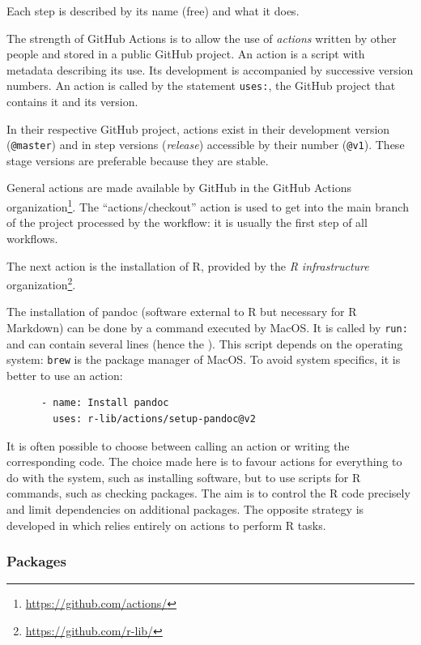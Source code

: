 \documentclass[
  12pt,
  american,
  a4paper,
  extrafontsizes,onecolumn,openright
  ]{memoir}
\newlength{\rf}
\begin{document}
Each step is described by its name (free) and what it does.

The strength of GitHub Actions is to allow the use of \emph{actions} written by other people and stored in a public GitHub project.
An action is a script with metadata describing its use.
Its development is accompanied by successive version numbers.
An action is called by the statement \texttt{uses:}, the GitHub project that contains it and its version.

In their respective GitHub project, actions exist in their development version (\texttt{@master}) and in step versions (\emph{release}) accessible by their number (\texttt{@v1}).
These stage versions are preferable because they are stable.

General actions are made available by GitHub in the GitHub Actions organization\footnote{\url{https://github.com/actions/}}.
The \enquote{actions/checkout} action is used to get into the main branch of the project processed by the workflow: it is usually the first step of all workflows.

The next action is the installation of R, provided by the \emph{R infrastructure} organization\footnote{\url{https://github.com/r-lib/}}.

The installation of pandoc (software external to R but necessary for R Markdown) can be done by a command executed by MacOS.
It is called by \texttt{run:} and can contain several lines (hence the \texttt{\textbar{}}).
This script depends on the operating system: \texttt{brew} is the package manager of MacOS.
To avoid system specifics, it is better to use an action:

\begin{verbatim}
      - name: Install pandoc
        uses: r-lib/actions/setup-pandoc@v2
\end{verbatim}

It is often possible to choose between calling an action or writing the corresponding code.
The choice made here is to favour actions for everything to do with the system, such as installing software, but to use scripts for R commands, such as checking packages.
The aim is to control the R code precisely and limit dependencies on additional packages.
The opposite strategy is developed in \textcite{Wickham2023} which relies entirely on actions to perform R tasks.

\hypertarget{sec:packages-ci}{%
\subsubsection{Packages}\label{sec:packages-ci}}
\end{document}
